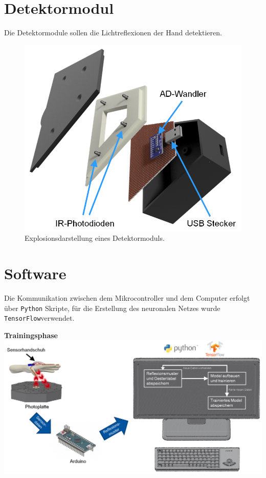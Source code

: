 \documentclass{sciposter}
\begin{document}
\begin{multicols}{3}

\section{Detektormodul}
\noindent
Die Detektormodule sollen die Lichtreflexionen der Hand detektieren.

\begin{figure}[h]
	\centering
	\includegraphics[scale=1.2]{../CAD_Bilder/Detektormodul/Detektormodul_beschriftet.png}
	\caption{Explosionsdarstellung eines Detektormoduls.}
	\label{fig:Detektormodul}
\end{figure}


\section{Software}
\noindent
Die Kommunikation zwischen dem Mikrocontroller und dem Computer erfolgt über \texttt{Python} Skripte, für die Erstellung des neuronalen Netzes wurde \texttt{TensorFlow}\texttrademark verwendet.

\centering

\vfill

\textbf{Trainingsphase}\\
\vspace{1.0cm}
\includegraphics[scale=0.7]{../figures/Anlernphase.png}


\end{multicols}
\end{document}
